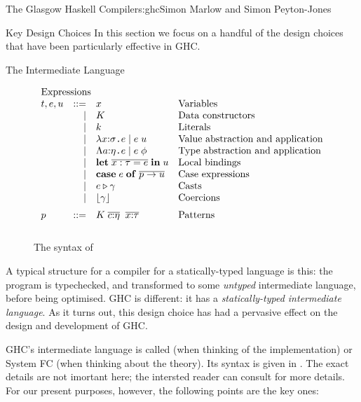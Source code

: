 \begin{aosachapter}{The Glasgow Haskell Compiler}{s:ghc}{Simon Marlow and Simon Peyton-Jones}
\begin{aosasect1}{Key Design Choices}
In this section we focus on a handful of the design choices that have
been particularly effective in GHC.

\begin{aosasect2}{The Intermediate Language}
\label{s:core}

\newcommand{\clift}[1]{\lfloor#1\rfloor}
\newcommand{\ol}[1]{\overline{#1}}
\newcommand{\tcase}[2]{\mathbf{case}\;#1\;\mathbf{of}\;\ol{#2}}
\newcommand{\tlet}[4]{\mathbf{let}\;#1{:}#2 = #3\;\mathbf{in}\;#4}
\newcommand{\tcast}[2]{#1\xspace\triangleright\xspace#2}
\begin{figure}
$$
\begin{array}{lrll}
\multicolumn{3}{l}{\text{Expressions}} \\
t,e,u & ::= & x  & \text{Variables} \\
      & \mid & K & \text{Data constructors} \\ 
      & \mid & k & \text{Literals} \\
      & \mid & \lambda x{:}\sigma \code{.} e \mid e\;u 
             & \text{Value abstraction and application} \\ 
    & \mid   &  \Lambda a{:}\eta \code{.} e \mid e\;\phi
             & \text{Type abstraction and application} \\ 
    & \mid    & \mathbf{let}\;\ol{x:\tau = e}\;\mathbf{in}\;u 
             & \text{Local bindings} \\ 
    & \mid    & \tcase{e}{p \to u} 
             & \text{Case expressions} \\ 
    & \mid    & \tcast{e}{\gamma}         &  \text{Casts} \\
    & \mid    & \clift{\gamma}            &  \text{Coercions} \\[2mm] 
 p  & ::=     & K\; \ol{c{:}\eta}\;\;\ol{x{:}\tau} & \text{Patterns} \\[3mm]
\end{array} 
$$
\label{fig:core-syntax}
\caption{The syntax of \Core{}}
\end{figure}

A typical structure for a compiler for a statically-typed language is
this: the program is typechecked, and transformed to some
\emph{untyped} intermediate language, before being optimised.  GHC is
different: it has a \emph{statically-typed intermediate language}.  As
it turns out, this design choice has had a pervasive effect on the
design and development of GHC.

GHC's intermediate language is called \Core{} (when thinking of the
implementation) or System FC (when thinking about the theory).  Its
syntax is given in .  The exact details
are not imortant here; the intersted reader can consult
\citet{bib:system-f} for more details.  For our present purposes,
however, the following points are the key ones:


\end{aosasect2}
\end{aosasect1}
\end{aosachapter}
